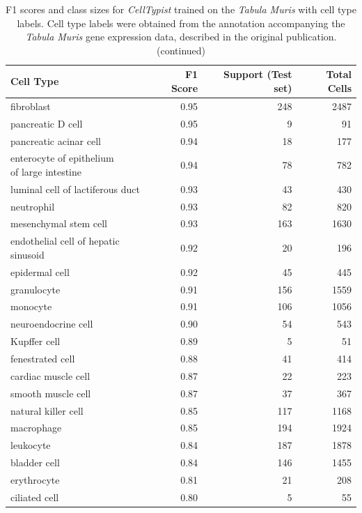 \begin{table}[pht!]
\small
\caption[F1 scores and class sizes for \textit{CellTypist} trained on the \textit{Tabula Muris} with cell type labels (continued)]{F1 scores and class sizes for \textit{CellTypist} trained on the \textit{Tabula Muris} with cell type labels. Cell type labels were obtained from the annotation accompanying the \textit{Tabula Muris} gene expression data, described in the original publication. (continued)}
\centering
\label{table:tab_tmmodelcells2}

\begin{tabular}{lrrr}
  \toprule
Cell Type & F1 Score & Support (Test set) & Total Cells \\ 
  \midrule
fibroblast & 0.95 & 248 & 2487 \\ 
  pancreatic D cell & 0.95 &   9 &  91 \\ 
  pancreatic acinar cell & 0.94 &  18 & 177 \\ 
  \specialcell[t]{enterocyte of epithelium\\of large intestine} & 0.94 &  78 & 782 \\ 
  luminal cell of lactiferous duct & 0.93 &  43 & 430 \\ 
  neutrophil & 0.93 &  82 & 820 \\ 
  mesenchymal stem cell & 0.93 & 163 & 1630 \\ 
  endothelial cell of hepatic sinusoid & 0.92 &  20 & 196 \\ 
  epidermal cell & 0.92 &  45 & 445 \\ 
  granulocyte & 0.91 & 156 & 1559 \\ 
  monocyte & 0.91 & 106 & 1056 \\ 
  neuroendocrine cell & 0.90 &  54 & 543 \\ 
  Kupffer cell & 0.89 &   5 &  51 \\ 
  fenestrated cell & 0.88 &  41 & 414 \\ 
  cardiac muscle cell & 0.87 &  22 & 223 \\ 
  smooth muscle cell & 0.87 &  37 & 367 \\ 
  natural killer cell & 0.85 & 117 & 1168 \\ 
  macrophage & 0.85 & 194 & 1924 \\ 
  leukocyte & 0.84 & 187 & 1878 \\ 
  bladder cell & 0.84 & 146 & 1455 \\ 
  erythrocyte & 0.81 &  21 & 208 \\ 
  ciliated cell & 0.80 &   5 &  55 \\ 

\end{tabular}
\end{table}
